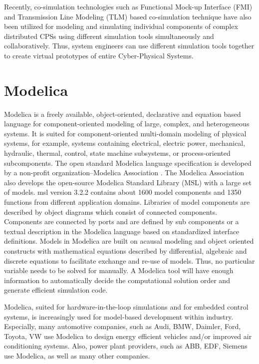 Recently, co-simulation technologies such as Functional Mock-up Interface (FMI) \cite{fmi, fmiblochwitz} and Transmission Line Modeling (TLM) based co-simulation technique \cite{tlmkurs90,tlmcogan,tlmjohns,tlmkurs99} have also been utilized for modeling and  simulating individual components of complex distributed  CPSs using different simulation tools simultaneously and collaboratively. Thus, system engineers can use different simulation tools together to create virtual prototypes of entire Cyber-Physical Systems. 

\section{Modelica}
\label{sec:modelica}


Modelica \cite{modelica, modelicapeterbook, modelicapeter} is a freely available, object-oriented, declarative and equation based language for component-oriented modeling of large, complex, and heterogeneous systems.  It is suited for component-oriented multi-domain modeling of physical systems, for example, systems containing electrical, electric power, mechanical, hydraulic, thermal, control,  state machine subsystems, or process-oriented subcomponents. 
The open standard Modelica language specification is developed by a non-profit organization–Modelica Association \cite{modelicaassociation}. The Modelica Association also develops the open-source Modelica Standard Library (MSL) \cite{modelicamsl} with a large set of models. \acrshort{msl} version 3.2.2 \cite{modelica, modelicamsl} contains about 1600 model components and 1350 functions from different application domains. Libraries of model components are described by object diagrams which consist of connected components. Components are connected by ports and are defined by sub components or a textual description in the Modelica language based on standardized interface definitions.
Models in Modelica are built on acausal modeling and object oriented constructs with mathematical equations described by differential, algebraic and discrete equations to facilitate exchange and re-use of models. Thus, no particular variable needs to be solved for manually. A Modelica tool will have enough information to automatically decide the computational solution order and generate efficient simulation code.

Modelica, suited for hardware-in-the-loop simulations and for embedded control systems, is increasingly used for model-based development within industry. Especially, many automotive companies, such as Audi, BMW, Daimler, Ford, Toyota, VW use Modelica to design energy efficient vehicles and/or improved air conditioning systems. Also, power plant providers, such as ABB, EDF, Siemens use Modelica, as well as many other companies.

